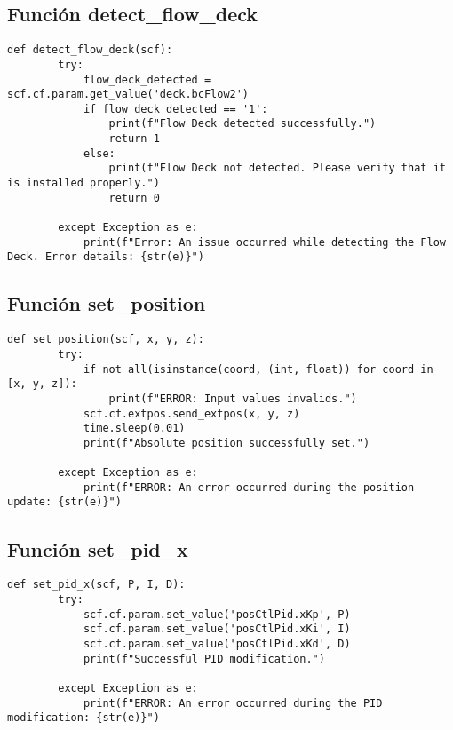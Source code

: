\subsection{Función detect\_flow\_deck}
\begin{lstlisting}[caption=Función en Python para detectar la placa Flow Deck en Crazyflie., label=code:funcion_detect_flow_deck]
	def detect_flow_deck(scf):
		try:
			flow_deck_detected = scf.cf.param.get_value('deck.bcFlow2')
			if flow_deck_detected == '1':
				print(f"Flow Deck detected successfully.")
				return 1
			else:
				print(f"Flow Deck not detected. Please verify that it is installed properly.")
				return 0
		
		except Exception as e:
			print(f"Error: An issue occurred while detecting the Flow Deck. Error details: {str(e)}")
\end{lstlisting}

\subsection{Función set\_position}
\begin{lstlisting}[caption=Función en Python para actualizar la posición del estimador del Crazyflie., label=code:funcion_set_position]
	def set_position(scf, x, y, z):
		try:
			if not all(isinstance(coord, (int, float)) for coord in [x, y, z]):
				print(f"ERROR: Input values invalids.")
			scf.cf.extpos.send_extpos(x, y, z)
			time.sleep(0.01)
			print(f"Absolute position successfully set.")
		
		except Exception as e:
			print(f"ERROR: An error occurred during the position update: {str(e)}")
\end{lstlisting}

\subsection{Función set\_pid\_x}
\begin{lstlisting}[caption=Función en Python para configurar a un PID de posición específico del Crazyflie., label=code:funcion_set_pid_x]
	def set_pid_x(scf, P, I, D):
		try:      
			scf.cf.param.set_value('posCtlPid.xKp', P)
			scf.cf.param.set_value('posCtlPid.xKi', I)
			scf.cf.param.set_value('posCtlPid.xKd', D)
			print(f"Successful PID modification.")
		
		except Exception as e:
			print(f"ERROR: An error occurred during the PID modification: {str(e)}")
\end{lstlisting}

